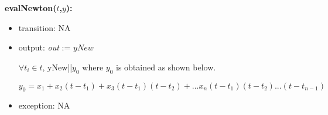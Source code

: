 \documentclass[12pt, titlepage]{article}
\begin{document}
\noindent \textbf{evalNewton($t$,$y$):}
\begin{itemize}
	\item transition: NA
	
	\item output:  \textit{out} := $yNew$
	
	$\forall t_i \in t$, yNew||$y_0$ where $y_0$ is obtained as shown 
	below.
	
	\begin{equation*}
	y_0 = x_1 + x_2(t-t_1) + x_3(t-t_1)(t-t_2) + ... 
	x_n(t-t_1)(t-t_2)...(t-t_{n-1})
	\end{equation*}

	\item exception: NA
\end{itemize}
\end{document}
